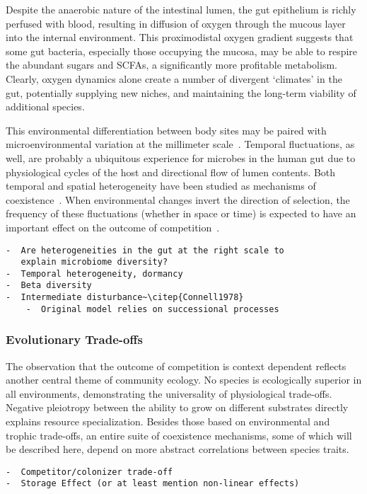 \documentclass[12pt]{article}
\begin{document}
Despite the anaerobic nature of the intestinal lumen,
the gut epithelium is richly perfused with blood, resulting
in diffusion of oxygen through the mucous layer into
the internal environment.
This proximodistal oxygen gradient suggests that some
gut bacteria, especially those occupying the mucosa,
may be able to respire the abundant sugars and SCFAs,
a significantly more profitable metabolism.
Clearly, oxygen dynamics alone create a number of
divergent `climates' in the gut,
potentially supplying new niches,
and maintaining the long-term viability of additional
species.

This environmental differentiation between body sites may be
paired with microenvironmental variation at the millimeter
scale~\citep{TODO}.
Temporal fluctuations, as well, are probably a ubiquitous
experience for microbes in the human gut due to physiological
cycles of the host and directional flow of lumen contents.
Both temporal and spatial heterogeneity have been studied as
mechanisms of coexistence~\citep{Chesson2000}.
When environmental changes invert the direction of selection,
the frequency of these fluctuations (whether in space or time)
is expected to have an important effect on the outcome of
competition~\citep{Hutchinson1961}.

\begin{verbatim}
-  Are heterogeneities in the gut at the right scale to
   explain microbiome diversity?
-  Temporal heterogeneity, dormancy
-  Beta diversity
-  Intermediate disturbance~\citep{Connell1978}
    -  Original model relies on successional processes
\end{verbatim}


\subsubsection{Evolutionary Trade-offs}
The observation that the outcome of competition is context
dependent reflects another central theme of community ecology.
No species is ecologically superior in all environments,
demonstrating the universality of physiological trade-offs.
Negative pleiotropy between the ability to grow on
different substrates directly explains resource specialization.
Besides those based on environmental and trophic trade-offs,
an entire suite of coexistence mechanisms,
some of which will be described here,
depend on more abstract correlations between species traits.

\begin{verbatim}
-  Competitor/colonizer trade-off
-  Storage Effect (or at least mention non-linear effects)
\end{verbatim}
\end{document}
